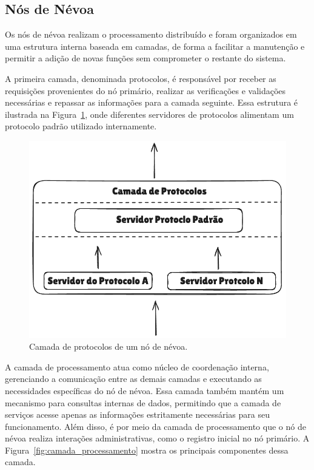 \subsection{Nós de Névoa}

Os nós de névoa realizam o processamento distribuído e foram organizados em uma estrutura interna baseada em camadas, de forma a facilitar a manutenção e permitir a adição de novas funções sem comprometer o restante do sistema.

A primeira camada, denominada protocolos, é responsável por receber as requisições provenientes do nó primário, realizar as verificações e validações necessárias e repassar as informações para a camada seguinte. Essa estrutura é ilustrada na Figura~\ref{fig:camada_protocolos}, onde diferentes servidores de protocolos alimentam um protocolo padrão utilizado internamente.

\begin{figure}[htb]
    \caption{\label{fig:camada_protocolos}Camada de protocolos de um nó de névoa.}
    \begin{center}
        \includegraphics[width=0.7\linewidth]{images/camada_protocolos.png}
    \end{center}
\end{figure}

A camada de processamento atua como núcleo de coordenação interna, gerenciando a comunicação entre as demais camadas e executando as necessidades específicas do nó de névoa. Essa camada também mantém um mecanismo para consultas internas de dados, permitindo que a camada de serviços acesse apenas as informações estritamente necessárias para seu funcionamento. Além disso, é por meio da camada de processamento que o nó de névoa realiza interações administrativas, como o registro inicial no nó primário. A Figura~\ref{fig:camada_processamento} mostra os principais componentes dessa camada.

